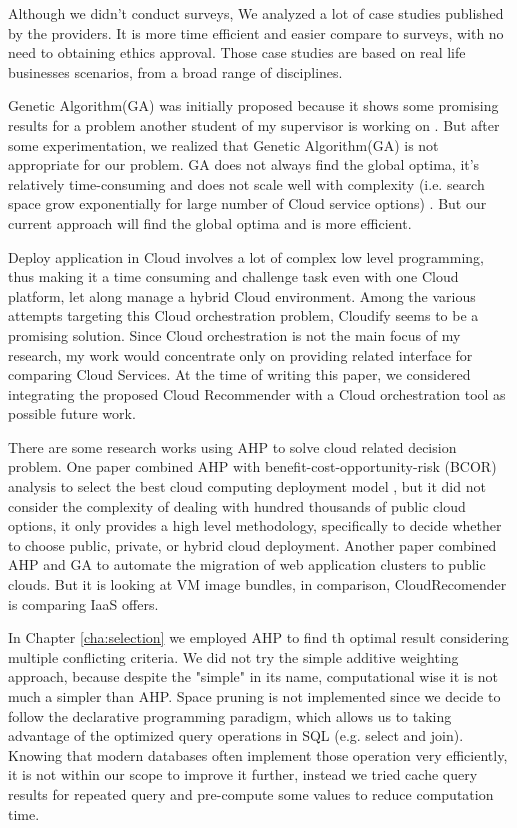 Although we didn't conduct surveys, We analyzed a lot of case studies published by the providers. It is more time efficient and easier compare to surveys, with no need to obtaining ethics approval. Those case studies are based on real life businesses scenarios, from a broad range of disciplines.

Genetic Algorithm(GA) was initially proposed because it shows some promising results for a problem another student of my supervisor is working on \cite{CloudGenius}. But after some experimentation, we realized that Genetic Algorithm(GA) is not appropriate for our problem. GA does not always find the global optima, it's
relatively time-consuming and does not scale well with complexity (i.e. search space grow
exponentially for large number of Cloud service options) \cite{GA_wiki}. But our current approach will find the global optima and is more efficient.

Deploy application in Cloud involves a lot of complex low level programming, thus making
it a time consuming and challenge task even with one Cloud platform, let along manage a
hybrid Cloud environment. Among the various attempts targeting this Cloud orchestration
problem, Cloudify \cite{Cloudify} seems to be a promising solution. Since Cloud orchestration is not the
main focus of my research, my work would concentrate only on providing related interface
for comparing Cloud Services. At the time of writing this paper, we considered integrating
the proposed Cloud Recommender with a Cloud orchestration tool as possible future
work.
 
There are some research works using AHP to solve cloud related decision problem. One
paper combined AHP with benefit-cost-opportunity-risk (BCOR) analysis to select the best
cloud computing deployment model \cite{AHP_BCOR}, but it did not consider the complexity of dealing with hundred thousands of public cloud options, it only provides a high level methodology, specifically to decide whether to choose public, private, or hybrid cloud deployment.  
Another paper \cite{CloudGenius} combined AHP and GA to automate the migration of web application clusters to public clouds. But it is looking at VM image bundles, in comparison,
CloudRecomender is comparing IaaS offers.

In Chapter \ref{cha:selection}
we employed AHP to find th optimal result considering
multiple conflicting criteria. We did not try the simple additive weighting approach,
because despite the "simple" in its name, computational wise it is not much a simpler than
AHP. Space pruning is not implemented since we decide to follow the declarative programming
paradigm, which allows us to taking advantage of the optimized query operations in SQL
(e.g. select and join). Knowing that modern databases often implement those operation
very efficiently, it is not within our scope to improve it further, instead we tried cache
query results for repeated query and pre-compute some values to reduce computation time.


